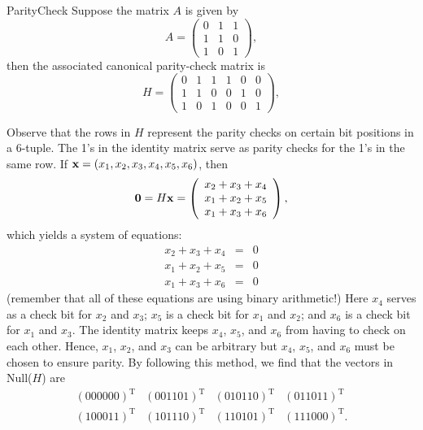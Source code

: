 \begin{example}{ParityCheck}
Suppose the matrix $A$ is given by
\[
A =
\left(
\begin{array}{ccc}
0 & 1 & 1 \\
1 & 1 & 0 \\
1 & 0 & 1
\end{array}
\right),
\]
then the associated canonical parity-check matrix is
\[
H =
\left(
\begin{array}{cccccc}
0 & 1 & 1 & 1 & 0 & 0 \\
1 & 1 & 0 & 0 & 1 & 0 \\
1 & 0 & 1 & 0 & 0 & 1
\end{array}
\right),
\]

Observe that the rows in $H$  represent the parity checks on certain
bit positions in a 6-tuple. The 1's in the identity matrix serve as
parity checks for the 1's in the same row. If ${\bold x} = (x_1, x_2,
x_3, x_4, x_5, x_6)$, then 
\[
{\bold 0}
=
H{\bold x}
=
\left(
\begin{array}{l}
x_2 + x_3 + x_4 \\
x_1 + x_2 + x_5\\
x_1 + x_3 + x_6
\end{array}
\right),
\]
which yields a system of equations:
\begin{eqnarray*}
x_2 + x_3 + x_4 & = & 0 \\
x_1 + x_2 + x_5 & = & 0 \\
x_1 + x_3 + x_6 & = & 0
\end{eqnarray*}
(remember that all of these equations are using binary arithmetic!) Here $x_4$ serves as a check bit for $x_2$ and $x_3$; $x_5$ is a check
bit for $x_1$ and $x_2$; and $x_6$ is a check bit for $x_1$ and $x_3$.
The identity matrix keeps $x_4$, $x_5$, and $x_6$ from having to check
on each other. Hence, $x_1$, $x_2$, and $x_3$ can be arbitrary but
$x_4$, $x_5$, and $x_6$ must be chosen to ensure parity. By following this method, we find that the vectors in Null($H$) are
\[
\begin{array}{cccc}
 (000000)^{\mathrm{T}} & (001101)^{\mathrm{T}} & (010110)^{\mathrm{T}} & (011011)^{\mathrm{T}} \\
 (100011)^{\mathrm{T}} & (101110)^{\mathrm{T}} & (110101)^{\mathrm{T}} & (111000)^{\mathrm{T}}.
\end{array}
\]
\end{example}

